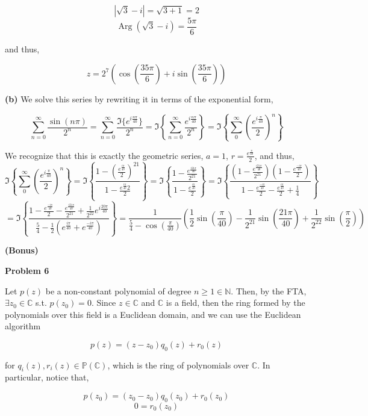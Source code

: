 \documentclass[12pt]{article}
\newcommand{\C}{\mathbb{C}}
\DeclareMathOperator{\Arg}{Arg}
\begin{document}
$$|\sqrt{3}-i| = \sqrt{3+1} = 2$$
$$\Arg (\sqrt{3}-i) = \frac{5\pi}{6}$$

and thus,

$$z = 2^{7}\left (\cos\left(\frac{35\pi}{6}\right) + i\sin\left(\frac{35\pi}{6}\right)\right)$$

\textbf{(b)}
We solve this series by rewriting it in terms of the exponential form,

$$\sum_{n=0}^{\infty}\frac{\sin\left(n\pi\right)}{2^{n}} = \sum_{n=0}^{\infty}\frac{\Im \{ e^{i\frac{n\pi}{40}} \}}{2^{n}} = \Im \left\{ \sum_{n=0}^{\infty} \frac{e^{i\frac{n\pi}{40}}}{2^{n}} \right\} = \Im \left \{ \sum_{0}^{\infty}\left( \frac{e^{i\frac{\pi}{40}}}{2}\right)^{n} \right \}$$

We recognize that this is exactly the geometric series, $a=1$, $r=\frac{e^{\frac{\pi}{40}}}{2}$, and thus,
$$\Im \left \{ \sum_{0}^{\infty}\left( \frac{e^{i\frac{\pi}{40}}}{2}\right)^{n} \right \} = \Im \left \{ \frac{1-\left(\frac{e^{\frac{i\pi}{40}}}{2}\right)^{21}}{1-\frac{e^{\frac{i\pi}{40}}{2}}{2}} \right \} =  \Im \left \{ \frac{1-\frac{e^{\frac{i21\pi}{40}}}{2^{21}}}{1-\frac{e^{\frac{i\pi}{40}}}{2}} \right \} = \Im \left \{ \frac{\left(1-\frac{e^{\frac{i21\pi}{40}}}{2^{21}}\right )\left(1-\frac{e^{\frac{-i\pi}{40}}}{2}\right )}{1-\frac{e^{\frac{-i\pi}{40}}}{2}-\frac{e^{\frac{i\pi}{40}}}{2} + \frac{1}{4}} \right \}$$
$$= \Im \left \{ \frac{1-\frac{e^{\frac{-i\pi}{40}}}{2}-\frac{e^{\frac{i21\pi}{40}}}{2^{21}} + \frac{1}{2^{22}}e^{i\frac{20\pi}{40}}}{\frac{5}{4}-\frac{1}{2}\left(e^{\frac{i\pi}{40}}+ e^{\frac{-i\pi}{40}}\right)} \right \} = \frac{1}{\frac{5}{4} - \cos\left(\frac{\pi}{40}\right)}\left(\frac{1}{2}\sin\left(\frac{\pi}{40}\right) - \frac{1}{2^{21}}\sin\left(\frac{21\pi}{40}\right) + \frac{1}{2^{22}}\sin\left(\frac{\pi}{2}\right)\right)$$

\textbf{(Bonus)}

\textbf{Problem 6}

Let $p(z)$ be a non-constant polynomial of degree $n \ge 1 \in \mathbb{N}$. Then, by the FTA, $\exists z_{0} \in \C $ s.t. $p(z_{0})=0$. Since $z \in \C$ and $\C$ is a field, then the ring formed by the polynomials over this field is a Euclidean domain, and we can use the Euclidean algorithm

$$p(z) = (z-z_{0})q_{0}(z) + r_{0}(z)$$

for $q_{i}(z), r_{i}(z) \in \mathbb{P}(\C)$, which is the ring of polynomials over $\C$. In particular, notice that,

$$p(z_{0}) = (z_{0}-z_{0})q_{0}(z_{0}) + r_{0}(z_{0})$$
$$0 = r_{0}(z_{0})$$
\end{document}
